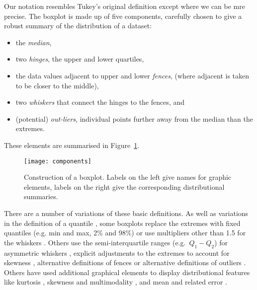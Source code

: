 \documentclass[oneside]{article}
\begin{document}
Our notation resembles Tukey's original definition except where we can be mre precise.  The boxplot is made up of five components, carefully chosen to give a robust summary of the distribution of a dataset:

\begin{itemize}

\item the \emph{median},

\item two \emph{hinges}, the upper and lower quartiles,

\item the data values adjacent to upper and lower \emph{fences}, (where adjacent is taken to be closer to the middle),

\item two \emph{whiskers} that connect the hinges to the fences, and

\item (potential) \emph{out-liers}, individual points further away from the median than the extremes.

\end{itemize}

\noindent These elements are summarised in Figure~\ref{fig:construction}.

\begin{figure}[htbp]
  \centering
    \texttt{[image: components]}
  \caption{Construction of a boxplot.  Labels on the left give names for graphic elements, labels on the right give the corresponding distributional summaries.}
  \label{fig:construction}
\end{figure}

There are a number of variations of these basic definitions. As well as variations in the definition of a quantile \citep{hyndman:1996}, some boxplots replace the extremes with fixed quantiles (e.g. min and max, 2\% and 98\%) or use multipliers other than 1.5 for the whiskers \citep{frigge:1989}. Others use the semi-interquartile ranges (e.g.\ $Q_1 - Q_2$) for asymmetric whiskers \citep{Rousseeuw1999}, explicit adjustments to the extremes to account for skewness \citep{hubert:2008}, alternative definitions of fences \citep{dumbgen:2007} or alternative definitions of outliers \citep{schwertman:2004,carter:2009}. Others have used additional graphical elements to display distributional features like kurtosis \citep{aslam:1991}, skewness and multimodality \citep{choonpradub:2005}, and mean and related error \citep{marmolejo-ramos:2010}.
\end{document}
